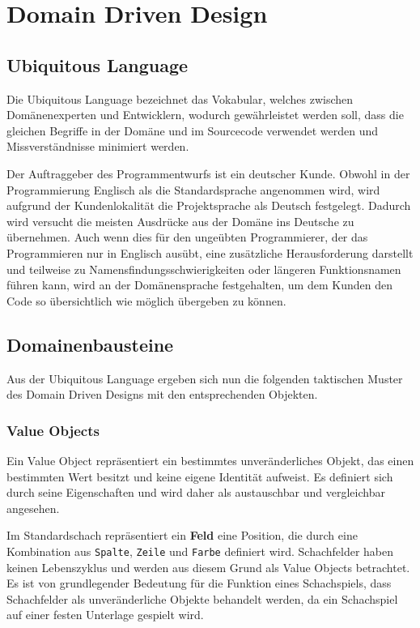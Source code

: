 \chapter{Domain Driven Design}

\section{Ubiquitous Language}

Die Ubiquitous Language bezeichnet das Vokabular, welches zwischen Domänenexperten
und Entwicklern, wodurch gewährleistet werden soll, dass die gleichen Begriffe in der
Domäne und im Sourcecode verwendet werden und Missverständnisse minimiert werden.

Der Auftraggeber des Programmentwurfs ist ein deutscher Kunde. 
Obwohl in der Programmierung Englisch als die Standardsprache angenommen wird, wird aufgrund der Kundenlokalität die Projektsprache als \glqq Deutsch\grqq{} festgelegt. 
Dadurch wird versucht die meisten Ausdrücke aus der Domäne ins Deutsche zu übernehmen. 
Auch wenn dies für den ungeübten Programmierer, der das Programmieren nur in Englisch ausübt, eine zusätzliche Herausforderung darstellt und teilweise zu Namensfindungsschwierigkeiten oder längeren Funktionsnamen führen kann, wird an der Domänensprache festgehalten, um dem Kunden den Code so übersichtlich wie möglich übergeben zu können.

\section{Domainenbausteine}

Aus der Ubiquitous Language ergeben sich nun die folgenden taktischen Muster des Domain
Driven Designs mit den entsprechenden Objekten.

\subsection*{Value Objects}

Ein Value Object repräsentiert ein bestimmtes unveränderliches Objekt, das einen bestimmten Wert besitzt und keine eigene Identität aufweist. 
Es definiert sich durch seine Eigenschaften und wird daher als austauschbar und vergleichbar angesehen.

Im Standardschach repräsentiert ein \textbf{Feld} eine Position, die durch eine Kombination aus \texttt{Spalte}, \texttt{Zeile} und \texttt{Farbe} definiert wird. 
Schachfelder haben keinen Lebenszyklus und werden aus diesem Grund als Value Objects betrachtet. 
Es ist von grundlegender Bedeutung für die Funktion eines Schachspiels, dass Schachfelder als unveränderliche Objekte behandelt werden, da ein Schachspiel auf einer \glqq festen Unterlage\grqq{} gespielt wird. 

